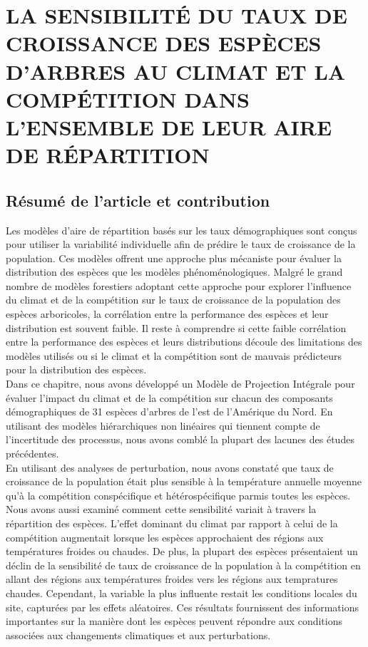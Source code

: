 \graphicspath{{chapter2/}{manuscript/}}

\chapter{\textbf{\MakeUppercase{  La sensibilité du taux de croissance
des espèces d'arbres au climat et la compétition dans l'ensemble de leur
aire de répartition}}}

\section{Résumé de l'article et contribution}

Les modèles d'aire de répartition basés sur les taux démographiques sont
conçus pour utiliser la variabilité individuelle afin de prédire le taux
de croissance de la population. Ces modèles offrent une approche plus
mécaniste pour évaluer la distribution des espèces que les modèles
phénoménologiques. Malgré le grand nombre de modèles forestiers adoptant
cette approche pour explorer l'influence du climat et de la compétition
sur le taux de croissance de la population des espèces arboricoles, la
corrélation entre la performance des espèces et leur distribution est
souvent faible. Il reste à comprendre si cette faible corrélation entre
la performance des espèces et leurs distributions découle des
limitations des modèles utilisés ou si le climat et la compétition sont
de mauvais prédicteurs pour la distribution des espèces.\\

Dans ce chapitre, nous avons développé un Modèle de Projection Intégrale
pour évaluer l'impact du climat et de la compétition sur chacun des
composants démographiques de 31 espèces d'arbres de l'est de l'Amérique
du Nord. En utilisant des modèles hiérarchiques non linéaires qui
tiennent compte de l'incertitude des processus, nous avons comblé la
plupart des lacunes des études précédentes.\\

En utilisant des analyses de perturbation, nous avons constaté que taux
de croissance de la population était plus sensible à la température
annuelle moyenne qu'à la compétition conspécifique et hétérospécifique
parmis toutes les espèces. Nous avons aussi examiné comment cette
sensibilité variait à travers la répartition des espèces. L'effet
dominant du climat par rapport à celui de la compétition augmentait
lorsque les espèces approchaient des régions aux températures froides ou
chaudes. De plus, la plupart des espèces présentaient un déclin de la
sensibilité de taux de croissance de la population à la compétition en
allant des régions aux températures froides vers les régions aux
tempratures chaudes. Cependant, la variable la plus influente restait
les conditions locales du site, capturées par les effets aléatoires. Ces
résultats fournissent des informations importantes sur la manière dont
les espèces peuvent répondre aux conditions associées aux changements
climatiques et aux perturbations.\\

